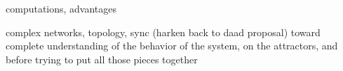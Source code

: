 computations, advantages

complex networks, topology, sync (harken back to daad proposal)
toward complete understanding of the behavior of the system, on the attractors, and before 
trying to put all those pieces together

